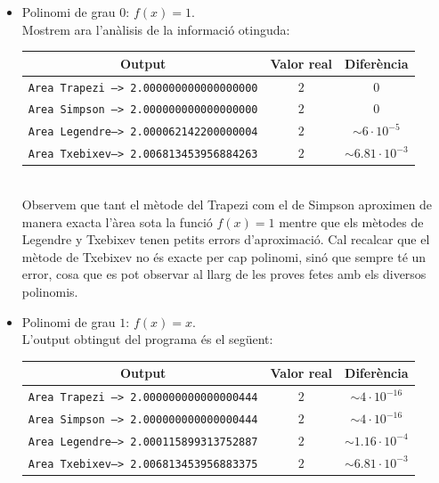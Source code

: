 \documentclass[12pt]{article}
\begin{document}
\begin{itemize}
    \item Polinomi de grau $0$: $f(x) = 1$.\\
    Mostrem ara l'anàlisis de la informació otinguda:
        \begin{table}[h]
        \begin{center}
        \begin{tabular}{ c | c | c }
         \textbf{Output}  & \textbf{Valor real}  & \textbf{Diferència}\\ \hline
        \texttt{Area Trapezi --> 2.000000000000000000} & $2$ & $0$\\ 
        \texttt{Area Simpson --> 2.000000000000000000} & $2$ & $0$\\ 
        \texttt{Area Legendre--> 2.000062142200000004} & $2$ & $\sim6\cdot 10^{-5}$\\ 
        \texttt{Area Txebixev--> 2.006813453956884263} & $2$ & $\sim6.81\cdot 10^{-3}$\\ 
        \end{tabular}
        \end{center}
    \end{table}\\
    Observem que tant el mètode del Trapezi com el de Simpson aproximen de manera exacta l'àrea sota la funció $f(x)=1$ mentre que els mètodes de Legendre y Txebixev tenen petits errors d'aproximació. Cal recalcar que el mètode de Txebixev no és exacte per cap polinomi, sinó que sempre té un error, cosa que es pot observar al llarg de les proves fetes amb els diversos polinomis.
    
    \item Polinomi de grau $1$: $f(x) = x$.\\
     L'output obtingut del programa és el següent:
         \begin{table}[h]
            \begin{center}
            \begin{tabular}{ c | c | c }
            \textbf{Output} & \textbf{Valor real}  & \textbf{Diferència}\\ \hline
            \texttt{Area Trapezi --> 2.000000000000000444} & $2$ & $\sim4\cdot 10^{-16}$\\ 
            \texttt{Area Simpson --> 2.000000000000000444} & $2$ & $\sim4\cdot 10^{-16}$\\ 
            \texttt{Area Legendre--> 2.000115899313752887} & $2$ & $\sim1.16\cdot 10^{-4}$\\ 
            \texttt{Area Txebixev--> 2.006813453956883375} & $2$ & $\sim6.81\cdot 10^{-3}$\\ 
            \end{tabular}
            \end{center}
        \end{table}


\end{itemize}
\end{document}
